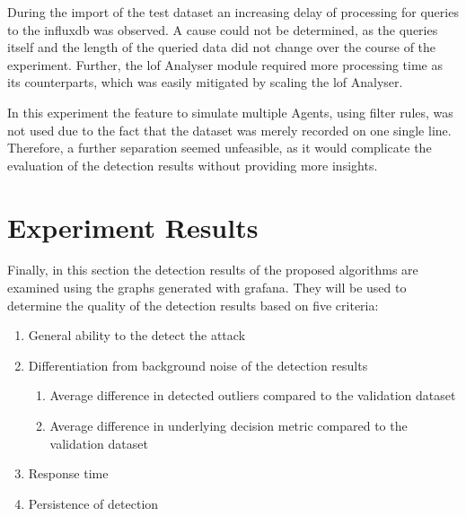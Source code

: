 During the import of the test dataset an increasing delay of processing for queries to the \gls{influxdb} was observed. A cause could not be determined, as the queries itself and the length of the queried data did not change over the course of the experiment.
Further, the \gls{lof} Analyser module required more processing time as its counterparts, which was easily mitigated by scaling the \gls{lof} Analyser.

In this experiment the feature to simulate multiple Agents, using filter rules, was not used due to the fact that the dataset was merely recorded on one single line. Therefore, a further separation seemed unfeasible, as it would complicate the evaluation of the detection results without providing more insights.

\newpage
\section{Experiment Results}
\label{sec:results:results}

Finally, in this section the detection results of the proposed algorithms are examined using the graphs generated with \gls{grafana}. They will be used to determine the quality of the detection results based on five criteria:
\begin{enumerate}
	\item General ability to the detect the attack
	\item Differentiation from background noise of the detection results
	\begin{enumerate}
		\item Average difference in detected outliers compared to the validation dataset
		\item Average difference in underlying decision metric compared to the validation dataset
	\end{enumerate}
	\item Response time 
	\item Persistence of detection
\end{enumerate}

